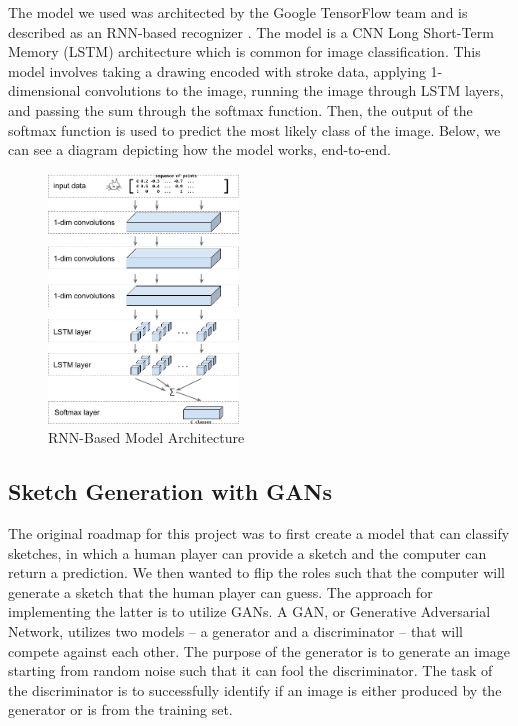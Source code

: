 \documentclass[10pt,twocolumn,letterpaper]{article}
\begin{document}
The model we used was architected by the Google TensorFlow team and is described as an RNN-based recognizer \cite{tensorflow-architecture}. The model is a CNN Long Short-Term Memory (LSTM) architecture which is common for image classification. This model involves taking a drawing encoded with stroke data, applying 1-dimensional convolutions to the image, running the image through LSTM layers, and passing the sum through the softmax function. Then, the output of the softmax function is used to predict the most likely class of the image. Below, we can see a diagram depicting how the model works, end-to-end.

\begin{figure}[H]
  \centering
  \includegraphics[width=0.45\textwidth]{quickdraw_architecture.png}
  \caption{RNN-Based Model Architecture}
\end{figure}

\subsection{Sketch Generation with GANs}

The original roadmap for this project was to first create a model that can classify sketches, in which a human player can provide a sketch and the computer can return a prediction. We then wanted to flip the roles such that the computer will generate a sketch that the human player can guess. The approach for implementing the latter is to utilize GANs. A GAN, or Generative Adversarial Network, utilizes two models – a generator and a discriminator – that will compete against each other. The purpose of the generator is to generate an image starting from random noise such that it can fool the discriminator. The task of the discriminator is to successfully identify if an image is either produced by the generator or is from the training set.
\end{document}
